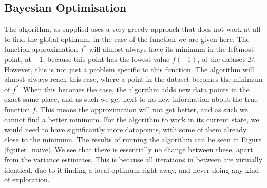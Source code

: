 \subsection{Bayesian Optimisation}
The algorithm, as supplied uses a very greedy approach that does not work at all to find the global optimum, in the case of the function we are given here. The function approximation $f^*$ will almost always have its minimum in the leftmost point, at $-1$, because this point has the lowest value $f(-1)$, of the dataset $\mathcal{D}$. However, this is not just a problem specific to this function. The algorithm will almost always reach this case, where a point in the dataset becomes the minimum of $f^*$. When this becomes the case, the algorithm adds new data points in the exact same place, and as such we get next to no new information about the true function $f$. This means the approximation will not get better, and as such we cannot find a better minimum. For the algorithm to work in its current state, we would need to have significantly more datapoints, with some of them already close to the minimum. The results of running the algorithm can be seen in Figure \ref{fig:iter_naive}. We see that there is essentially no change between these, apart from the variance estimates. This is because all iterations in between are virtually identical, due to it finding a local optimum right away, and never doing any kind of exploration.

